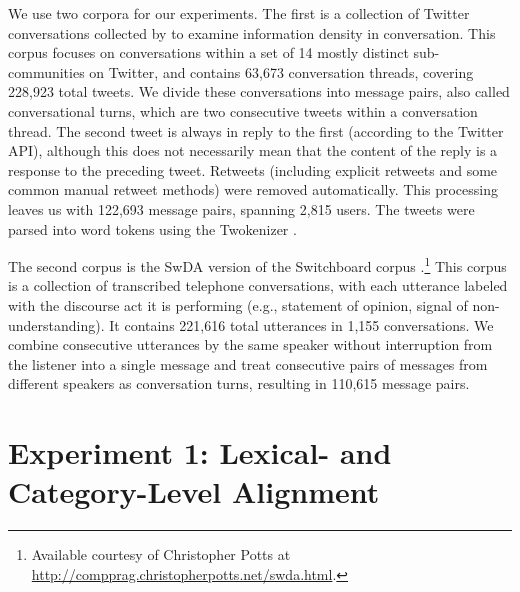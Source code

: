 \documentclass[11pt]{article}
\begin{document}
We use two corpora for our experiments. The first is a collection of Twitter conversations collected by \cite{DoyleFrank2015CMCL} to examine information density in conversation. This corpus focuses on conversations within a set of 14 mostly distinct sub-communities on Twitter, and contains 63,673 conversation threads, covering 228,923 total tweets.  We divide these conversations into message pairs, also called conversational turns, which are two consecutive tweets within a conversation thread.  The second tweet is always in reply to the first (according to the Twitter API), although this does not necessarily mean that the content of the reply is a response to the preceding tweet. Retweets (including explicit retweets and some common manual retweet methods) were removed automatically. This processing leaves us with 122,693 message pairs, spanning 2,815 users.  The tweets were parsed into word tokens using the Twokenizer \cite{OwoputiEtAl2013}.

The second corpus is the SwDA version of the Switchboard corpus \cite{godfrey1992switchboard,jurafsky1997switchboard}.\footnote{Available courtesy of Christopher Potts at \url{http://compprag.christopherpotts.net/swda.html}.} This corpus is a collection of transcribed telephone conversations, with each utterance labeled with the discourse act it is performing (e.g., statement of opinion, signal of non-understanding).  It contains 221,616 total utterances in 1,155 conversations.  We combine consecutive utterances by the same speaker without interruption from the listener into a single message and treat consecutive pairs of messages from different speakers as conversation turns, resulting in 110,615 message pairs.

\section{Experiment 1: Lexical- and Category-Level Alignment}
%

\end{document}
